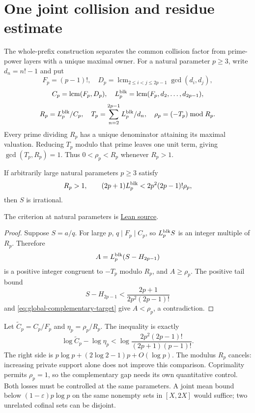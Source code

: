 \documentclass[11pt]{article}
\begin{document}
\section{One joint collision and residue estimate}\label{sec:projection}

The whole-prefix construction separates the common collision factor from
prime-power layers with a unique maximal owner.  For a natural parameter
$p\ge3$, write $d_n=n!-1$ and put
\[
F_p=(p-1)!,\quad
D_p=\operatorname{lcm}_{2\le i<j\le2p-1}\gcd(d_i,d_j),
\]
\[
C_p=\operatorname{lcm}(F_p,D_p),\quad
L_p^{\rm blk}=\operatorname{lcm}(F_p,d_2,\ldots,d_{2p-1}),
\]
\[
R_p=L_p^{\rm blk}/C_p,\quad
T_p=\sum_{n=2}^{2p-1}L_p^{\rm blk}/d_n,\quad
\rho_p=(-T_p)\bmod R_p.
\]
Every prime dividing $R_p$ has a unique denominator attaining its maximal
valuation.  Reducing $T_p$ modulo that prime leaves one unit term, giving
$\gcd(T_p,R_p)=1$.  Thus $0<\rho_p<R_p$ whenever $R_p>1$.

\begin{proposition}
\label{res:global-complementary-criterion}
If arbitrarily large natural parameters $p\ge3$ satisfy
\begin{equation}
R_p>1,\qquad
(2p+1)L_p^{\rm blk}<2p^2(2p-1)!\rho_p,
\label{eq:global-complementary-target}
\end{equation}
then $S$ is irrational.
\end{proposition}

\noindent The criterion at natural parameters is
\href{https://github.com/wcook04/plectis-erdos/blob/f36a98bf3d3e6f65f1074e3b800e3293d5b8a51a/ErdosProblems/Erdos68/PaperCompleteExisting.lean#L156}{Lean source}.
\begin{proof}
Suppose $S=a/q$.  For large $p$, $q\mid F_p\mid C_p$, so
$L_p^{\rm blk}S$ is an integer multiple of $R_p$.  Therefore
\[
A=L_p^{\rm blk}(S-H_{2p-1})
\]
is a positive integer congruent to $-T_p$ modulo $R_p$, and $A\ge\rho_p$.
The positive tail bound
\[
S-H_{2p-1}<\frac{2p+1}{2p^2(2p-1)!}
\]
and \eqref{eq:global-complementary-target} give $A<\rho_p$, a contradiction.
\end{proof}

Let $\widetilde C_p=C_p/F_p$ and $\eta_p=\rho_p/R_p$.  The inequality is
exactly
\begin{equation}
\log\widetilde C_p-\log\eta_p
<\log\frac{2p^2(2p-1)!}{(2p+1)(p-1)!}.
\label{eq:joint-loss-budget}
\end{equation}
The right side is $p\log p+(2\log2-1)p+O(\log p)$.
The modulus $R_p$ cancels: increasing private support alone does not improve
this comparison.  Coprimality permits $\rho_p=1$, so the complementary gap
needs its own quantitative control.  Both losses must be controlled at the
same parameters.  A joint mean bound below $(1-\varepsilon)p\log p$ on the
same nonempty sets in $[X,2X]$ would suffice; two unrelated cofinal sets can
be disjoint.
\end{document}
